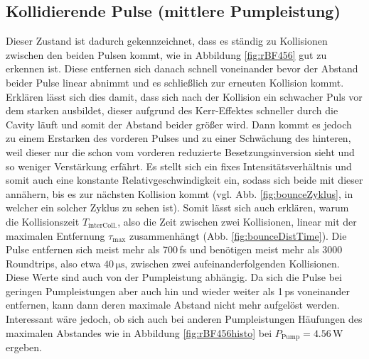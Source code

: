 \documentclass[bachelor,       %
               twoside,        %
               BCOR10mm,       %
               english,ngerman, %
               ]{GAUBM}
\begin{document}
\subsection{Kollidierende Pulse (mittlere Pumpleistung)}
Dieser Zustand ist dadurch gekennzeichnet, dass es ständig zu Kollisionen zwischen den beiden Pulsen kommt, wie in Abbildung \ref{fig:rBF456} gut zu erkennen ist.
Diese entfernen sich danach schnell voneinander bevor der Abstand beider Pulse linear abnimmt und es schließlich zur erneuten Kollision kommt.
Erklären lässt sich dies damit, dass sich nach der Kollision ein schwacher Puls vor dem starken ausbildet, dieser aufgrund des Kerr-Effektes schneller durch die Cavity läuft und somit der Abstand beider größer wird.
Dann kommt es jedoch zu einem Erstarken des vorderen Pulses und zu einer Schwächung des hinteren, weil dieser nur die schon vom vorderen reduzierte Besetzungsinversion sieht und so weniger Verstärkung erfährt.
Es stellt sich ein fixes Intensitätsverhältnis und somit auch eine konstante Relativgeschwindigkeit ein, sodass sich beide mit dieser annähern, bis es zur nächsten Kollision kommt (vgl. Abb. \ref{fig:bounceZyklus}, in welcher ein solcher Zyklus zu sehen ist).
Somit lässt sich auch erklären, warum die Kollisionszeit $T_\text{interColl.}$, also die Zeit zwischen zwei Kollisionen, linear mit der maximalen Entfernung $\tau_\text{max}$ zusammenhängt (Abb. \ref{fig:bounceDistTime}).
Die Pulse entfernen sich meist mehr als 700\,fs und benötigen meist mehr als 3000 Roundtrips, also etwa $40\,\si{\micro\second}$, zwischen zwei aufeinanderfolgenden Kollisionen.
Diese Werte sind auch von der Pumpleistung abhängig.
Da sich die Pulse bei geringen Pumpleistungen aber auch hin und wieder weiter als 1\,ps voneinander entfernen, kann dann deren maximale Abstand nicht mehr aufgelöst werden.
Interessant wäre jedoch, ob sich auch bei anderen Pumpleistungen Häufungen des maximalen Abstandes wie in Abbildung \ref{fig:rBF456histo} bei $P_\text{Pump}=4.56\,$W ergeben.
\end{document}

